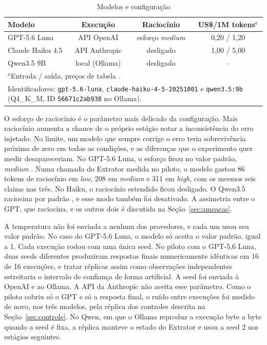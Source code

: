 \begin{table}[htbp]
\caption{Modelos e configuração}
\label{tab:modelos}
\centering
\footnotesize
\setlength{\tabcolsep}{3pt}
\begin{tabular}{|l|c|c|c|}
\hline
\textbf{Modelo} & \textbf{Execução} & \textbf{Raciocínio} & \textbf{US\$/1M tokens$^{a}$} \\
\hline
GPT-5.6 Luna & API OpenAI & esforço \emph{medium} & 0,20 / 1,20 \\
Claude Haiku 4.5 & API Anthropic & desligado & 1,00 / 5,00 \\
Qwen3.5 9B & local (Ollama) & desligado & -- \\
\hline
\multicolumn{4}{l}{\scriptsize $^{a}$Entrada / saída, preços de tabela \cite{openai2026pricing, anthropic2026pricing}.} \\
\multicolumn{4}{p{0.92\columnwidth}}{\scriptsize Identificadores: \texttt{gpt-5.6-luna}, \texttt{claude-haiku-4-5-20251001} e \texttt{qwen3.5:9b} (Q4\_K\_M, ID \texttt{56671c2ab938} no Ollama).} \\
\end{tabular}
\end{table}

O esforço de raciocínio é o parâmetro mais delicado da configuração.
Mais raciocínio aumenta a chance de o próprio estágio notar a inconsistência do erro injetado. No limite, um modelo que sempre corrige o erro teria sobrevivência próxima de zero em todas as condições, e as diferenças que o experimento quer medir desapareceriam.
No GPT-5.6 Luna, o esforço ficou no valor padrão, \emph{medium} \cite{openai2026luna}. Numa chamada do Extrator medida no piloto, o modelo gastou 86 tokens de raciocínio em \emph{low}, 208 em \emph{medium} e 311 em \emph{high}, com os mesmos seis claims nas três.
No Haiku, o raciocínio estendido ficou desligado. O Qwen3.5 raciocina por padrão \cite{qwen2026qwen35}, e esse modo também foi desativado.
A assimetria entre o GPT, que raciocina, e os outros dois é discutida na Seção~\ref{sec:ameacas}.

A temperatura não foi enviada a nenhum dos provedores, e cada um usou seu valor padrão. No caso do GPT-5.6 Luna, o modelo só aceita o valor padrão, igual a 1.
Cada execução rodou com uma única seed.
No piloto com o GPT-5.6 Luna, duas seeds diferentes produziram respostas finais numericamente idênticas em 16 de 16 execuções, e tratar réplicas assim como observações independentes estreitaria o intervalo de confiança de forma artificial.
A seed foi enviada à OpenAI e ao Ollama. A API da Anthropic não aceita esse parâmetro.
Como o piloto cobriu só o GPT e só a resposta final, o ruído entre execuções foi medido de novo, nos três modelos, pela réplica dos controles descrita na Seção~\ref{sec:controle}. No Qwen, em que o Ollama reproduz a execução byte a byte quando a seed é fixa, a réplica manteve o estado do Extrator e usou a seed 2 nos estágios seguintes.

